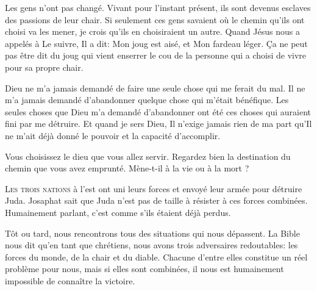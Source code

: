 Les gens n'ont pas changé. Vivant pour l'instant présent, ils sont devenus
 esclaves des passions de leur chair. Si seulement ces gens savaient
 où le chemin qu'ils ont choisi va les mener, je crois qu'ils en choisiraient
 un autre. Quand Jésus nous a appelés à Le suivre, Il a dit:
 \Og Mon joug est aisé, et Mon fardeau léger. \Fg{}
 Ça ne peut pas être dit du joug qui vient enserrer le cou de la personne
 qui a choisi de vivre pour sa propre chair. 

Dieu ne m'a jamais demandé de faire une seule chose qui me ferait du mal.
 Il ne m'a jamais demandé d'abandonner quelque chose qui m'était bénéfique.
 Les seules choses que Dieu m'a demandé d'abandonner ont été ces choses
 qui auraient fini par me détruire. Et quand je sers Dieu,
 Il n'exige jamais rien de ma part qu'Il ne m'ait déjà donné le pouvoir
 et la capacité d'accomplir. 

Vous choisissez le dieu que vous allez servir. Regardez bien la destination
 du chemin que vous avez emprunté. Mène-t-il à la vie ou à la mort ? 

\dvrule






\lettrine{L}{es trois nations} à l'est ont uni leurs forces et envoyé
 leur armée pour détruire Juda. Josaphat sait que Juda n'est pas de taille
 à résister à ces forces combinées.
 Humainement parlant, c'est comme s'ils étaient déjà perdus. 

Tôt ou tard, nous rencontrons tous des situations qui nous dépassent.
 La Bible nous dit qu'en tant que chrétiens,
 nous avons trois adversaires redoutables: les forces du monde,
 de la chair et du diable. Chacune d'entre elles constitue un réel problème
 pour nous, mais si elles sont combinées, il nous est humainement impossible
 de connaître la victoire. 


